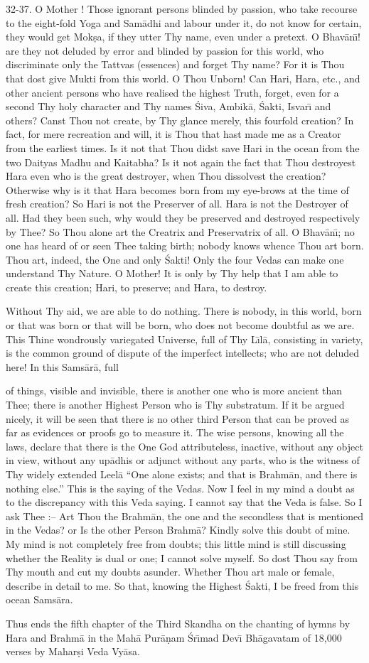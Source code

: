 32-37. O Mother ! Those ignorant persons blinded by passion, who take recourse to the eight-fold Yoga and Sam\=adhi and labour under it, do not know for certain, they would get Mok\d{s}a, if they utter Thy name, even under a pretext. O Bhav\=an\={\i}! are they not deluded by error and blinded by passion for this world, who discriminate only the Tattvas (essences) and forget Thy name? For it is Thou that dost give Mukti from this world. O Thou Unborn! Can Hari, Hara, etc., and other ancient persons who have realised the highest Truth, forget, even for a second Thy holy character and Thy names \'Siva, Ambik\=a, \'Sakti, Isvar\={\i} and others? Canst Thou not create, by Thy glance merely, this fourfold creation? In fact, for mere recreation and will, it is Thou that hast made me as a Creator from the earliest times. Is it not that Thou didst save Hari in the ocean from the two Daityas Madhu and Kaitabha? Is it not again the fact that Thou destroyest Hara even who is the great destroyer, when Thou dissolvest the creation? Otherwise why is it that Hara becomes born from my eye-brows at the time of fresh creation? So Hari is not the Preserver of all. Hara is not the Destroyer of all. Had they been such, why would they be preserved and destroyed respectively by Thee? So Thou alone art the Creatrix and Preservatrix of all. O Bhav\=an\={\i}; no one has heard of or seen Thee taking birth; nobody knows whence Thou art born. Thou art, indeed, the One and only \'Sakti! Only the four Vedas can make one understand Thy Nature. O Mother! It is only by Thy help that I am able to create this creation; Hari, to preserve; and Hara, to destroy.

Without Thy aid, we are able to do nothing. There is nobody, in this world, born or that was born or that will be born, who does not become doubtful as we are. This Thine wondrously variegated Universe, full of Thy L\={\i}l\=a, consisting in variety, is the common ground of dispute of the imperfect intellects; who are not deluded here! In this Sams\=ar\=a, full

of things, visible and invisible, there is another one who is more ancient than Thee; there is another Highest Person who is Thy substratum. If it be argued nicely, it will be seen that there is no other third Person that can be proved as far as evidences or proofs go to measure it. The wise persons, knowing all the laws, declare that there is the One God attributeless, inactive, without any object in view, without any up\=adhis or adjunct without any parts, who is the witness of Thy widely extended Leel\=a ``One alone exists; and that is Brahm\=an, and there is nothing else.'' This is the saying of the Vedas. Now I feel in my mind a doubt as to the discrepancy with this Veda saying. I cannot say that the Veda is false. So I ask Thee :-- Art Thou the Brahm\=an, the one and the secondless that is mentioned in the Vedas? or Is the other Person Brahm\=a? Kindly solve this doubt of mine. My mind is not completely free from doubts; this little mind is still discussing whether the Reality is dual or one; I cannot solve myself. So dost Thou say from Thy mouth and cut my doubts asunder. Whether Thou art male or female, describe in detail to me. So that, knowing the Highest \'Sakti, I be freed from this ocean Sams\=ara.

Thus ends the fifth chapter of the Third Skandha on the chanting of hymns by Hara and Brahm\=a in the Mah\=a Pur\=a\d{n}am \'Sr\={\i}mad Dev\={\i} Bh\=agavatam of 18,000 verses by Mahar\d{s}i Veda Vy\=asa.



